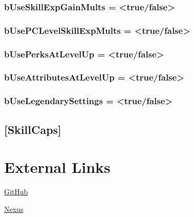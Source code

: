 \documentclass[12pt]{amsart}
\begin{document}
\subsubsection{bUseSkillExpGainMults = <true/false>}

\subsubsection{bUsePCLevelSkillExpMults = <true/false>}

\subsubsection{bUsePerksAtLevelUp = <true/false>}

\subsubsection{bUseAttributesAtLevelUp = <true/false>}

\subsubsection{bUseLegendarySettings = <true/false>}

\subsection{[SkillCaps]}

\startblock
\section{External Links}

\href{https://github.com/TheDreadedAndy/SkyrimAEUncapper-Rust}{GitHub}

\href{https://www.nexusmods.com/skyrimspecialedition/mods/82558}{Nexus}
\stopblock
\end{document}
